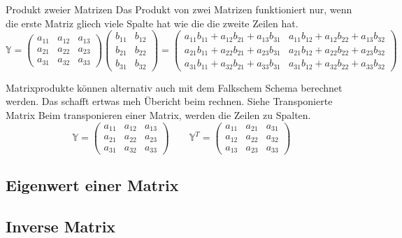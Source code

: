 \documentclass[9pt,a4paper]{article}
\begin{document}
    Produkt zweier Matrizen
    Das Produkt von zwei Matrizen funktioniert nur, wenn die erste Matriz gliech viele Spalte hat wie die die zweite Zeilen hat.
    \[
    \mathbb{Y} =
    \begin{pmatrix}
        a_{11} & a_{12} & a_{13} \\
        a_{21} & a_{22} & a_{23} \\
        a_{31} & a_{32} & a_{33}
    \end{pmatrix}
    \begin{pmatrix}
        b_{11} & b_{12} \\
        b_{21} & b_{22} \\
        b_{31} & b_{32}
    \end{pmatrix}
    =
    \begin{pmatrix}
        a_{11}b_{11} + a_{12}b_{21} + a_{13}b_{31} &
        a_{11}b_{12} + a_{12}b_{22} + a_{13}b_{32} \\
        a_{21}b_{11} + a_{22}b_{21} + a_{23}b_{31} &
        a_{21}b_{12} + a_{22}b_{22} + a_{23}b_{32} \\
        a_{31}b_{11} + a_{32}b_{21} + a_{33}b_{31} &
        a_{31}b_{12} + a_{32}b_{22} + a_{33}b_{32}
    \end{pmatrix}
    \]
    
    Matrixprodukte können alternativ auch mit dem Falkschem Schema berechnet werden. Das schafft ertwas meh Übericht beim rechnen. Siehe
    Transponierte Matrix
    Beim transponieren einer Matrix, werden die Zeilen zu Spalten.
    \[
    \mathbb{Y} =
    \begin{pmatrix}
        a_{11} & a_{12} & a_{13} \\
        a_{21} & a_{22} & a_{23} \\
        a_{31} & a_{32} & a_{33}
    \end{pmatrix}
    \qquad
    \mathbb{Y}^T =
    \begin{pmatrix}
        a_{11} & a_{21} & a_{31} \\
        a_{12} & a_{22} & a_{32} \\
        a_{13} & a_{23} & a_{33}
    \end{pmatrix}
    \]
    
    \subsection{Eigenwert einer Matrix}
    
    \subsection{Inverse Matrix}
    
\end{document}
